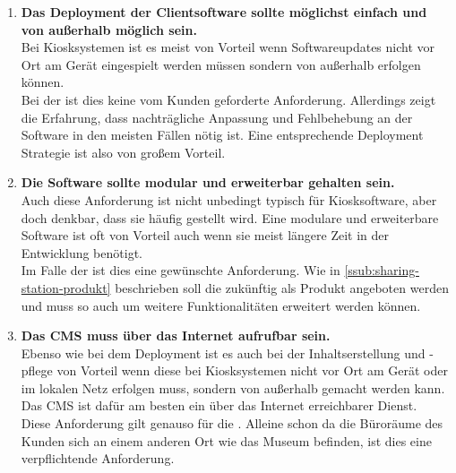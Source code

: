 \begin{enumerate}[label=\textbf{NFA\arabic*}]
  \item\label{nfa7} \textbf{Das Deployment der Clientsoftware sollte möglichst einfach und von außerhalb möglich sein.}\\
  Bei Kiosksystemen ist es meist von Vorteil wenn Softwareupdates nicht vor Ort am Gerät eingespielt werden 
  müssen sondern von außerhalb erfolgen können.\\
  Bei der \shst{} ist dies keine vom Kunden geforderte Anforderung. Allerdings zeigt die Erfahrung, dass nachträgliche
  Anpassung und Fehlbehebung an der Software in den meisten Fällen nötig ist. Eine entsprechende Deployment Strategie
  ist also von großem Vorteil.
  \item\label{nfa8} \textbf{Die Software sollte modular und erweiterbar gehalten sein.}\\
  Auch diese Anforderung ist nicht unbedingt typisch für Kiosksoftware, aber doch denkbar, dass sie häufig gestellt wird. 
  Eine modulare und erweiterbare Software ist oft von Vorteil auch wenn sie meist längere Zeit in der Entwicklung
  benötigt.\\
  Im Falle der \shst{} ist dies eine gewünschte Anforderung. Wie in \autoref{ssub:sharing-station-produkt} beschrieben
  soll die \shst{} zukünftig als Produkt angeboten werden und muss so auch um weitere Funktionalitäten 
  erweitert werden können. 
  \item\label{nfa9} \textbf{Das CMS muss über das Internet aufrufbar sein.}\\
  Ebenso wie bei dem Deployment ist es auch bei der Inhaltserstellung und -pflege von Vorteil wenn diese bei 
  Kiosksystemen nicht vor Ort am Gerät oder im lokalen Netz erfolgen muss, sondern von außerhalb gemacht 
  werden kann. Das CMS ist dafür am besten ein über das Internet erreichbarer Dienst.\\
  Diese Anforderung gilt genauso für die \shst{}. Alleine schon da die Büroräume des Kunden sich an einem 
  anderen Ort wie das Museum befinden, ist dies eine verpflichtende Anforderung.
\end{enumerate}
